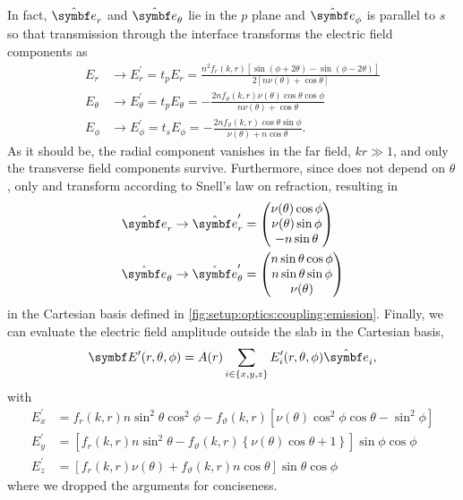 In fact, $\ubvec{r}$ and $\ubvec{\theta}$ lie in the $p$ plane and $\ubvec{\phi}$ is parallel to $s$ so that transmission through the interface transforms the electric field components as
\begin{align}
    E_r &\to E_r^\prime = t_p E_r = \frac{n^2 f_r(k, r) \left[\sin(\phi + 2\theta) - \sin(\phi - 2\theta)\right]}{2\left[n\nu(\theta) + \cos\theta\right]} \\
    E_\theta &\to E_\theta^\prime = t_p E_\theta = -\frac{2n f_{\vartheta}(k, r)\nu(\theta)\cos\theta\cos\phi}{n\nu(\theta) + \cos\theta} \\
    E_\phi &\to E_\phi^\prime = t_s E_\phi = -\frac{2n f_{\vartheta}(k, r)\cos\theta\sin\phi}{\nu(\theta) + n\cos\theta}.
\end{align}
As it should be, the radial component vanishes in the far field, $kr\gg 1$, and only the transverse field components survive.
Furthermore, since \ubvec{\phi} does not depend on $\theta$, only  and \ubvec{\theta} transform according to Snell's law on refraction, resulting in
\begin{align}
    \ubvec{r} \to \ubvec{r}^\prime &= \begin{pmatrix}
        \nu(\theta) \cos\phi \\
        \nu(\theta) \sin\phi \\
        - n\sin\theta
    \end{pmatrix} \\
    \ubvec{\theta} \to \ubvec{\theta}^{\prime} &= \begin{pmatrix}
        n \sin\theta\cos\phi \\
        n \sin\theta\sin\phi \\
        \nu(\theta)
    \end{pmatrix}
\end{align}
in the Cartesian basis defined in \cref{fig:setup:optics:coupling:emission}.
Finally, we can evaluate the electric field amplitude outside the slab in the Cartesian basis,
\begin{equation}
    \bvec{E}^\prime(r, \theta, \phi) = A(r) \sum_{i\in\{x, y, z\}} E_i^\prime(r, \theta, \phi)\ubvec{i},
\end{equation}
with
\begin{align}
    E_x^{\prime} &= f_{r}{\left(k,r \right)} n \sin^{2}{\theta} \cos^{2}{\phi} - f_{\vartheta}{\left(k,r \right)} \left[\nu{\left(\theta \right)} \cos^{2}{\phi} \cos{\theta} - \sin^{2}{\phi}\right] \\
    E_y^{\prime} &= \left[f_{r}{\left(k,r \right)} n \sin^{2}{\theta} - f_{\vartheta}{\left(k,r \right)} \left\lbrace\nu{\left(\theta \right)} \cos{\theta} + 1\right\rbrace\right] \sin{\phi} \cos{\phi} \\
    E_z^{\prime} &= \left[f_{r}{\left(k,r \right)} \nu{\left(\theta \right)} + f_{\vartheta}{\left(k,r \right)} n \cos{\theta}\right] \sin{\theta} \cos{\phi}
\end{align}
where we dropped the arguments for conciseness.

